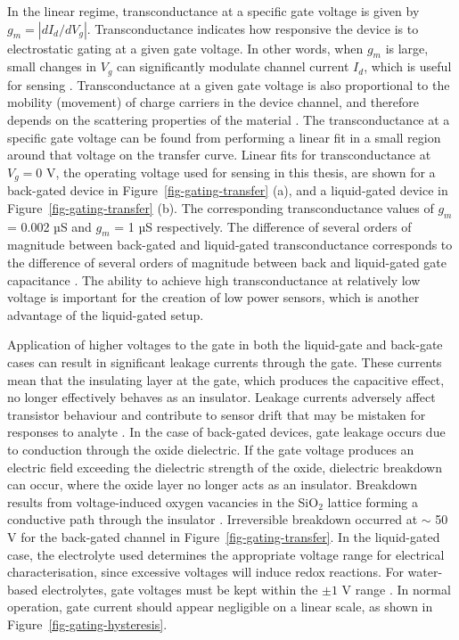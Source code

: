 \documentclass[
  a4paper,
]{scrbook}
\begin{document}
In the linear regime, transconductance at a specific gate voltage is
given by \(g_m = |dI_{d}/dV_g|\). Transconductance indicates how
responsive the device is to electrostatic gating at a given gate
voltage. In other words, when \(g_m\) is large, small changes in \(V_g\)
can significantly modulate channel current \(I_d\), which is useful for
sensing \autocite{Heller2009a,Ohno2015,Kireev2017}. Transconductance at
a given gate voltage is also proportional to the mobility (movement) of
charge carriers in the device channel, and therefore depends on the
scattering properties of the material
\autocite{Rouhi2010,Petti2016,Li2023}. The transconductance at a
specific gate voltage can be found from performing a linear fit in a
small region around that voltage on the transfer curve. Linear fits for
transconductance at \(V_g = 0\) V, the operating voltage used for
sensing in this thesis, are shown for a back-gated device in
Figure~\ref{fig-gating-transfer} (a), and a liquid-gated device in
Figure~\ref{fig-gating-transfer} (b). The corresponding transconductance
values of \(g_m\) = 0.002 µS and \(g_m\) = 1 µS respectively. The
difference of several orders of magnitude between back-gated and
liquid-gated transconductance corresponds to the difference of several
orders of magnitude between back and liquid-gated gate capacitance
\autocite{Tran2016,Shkodra2021}. The ability to achieve high
transconductance at relatively low voltage is important for the creation
of low power sensors, which is another advantage of the liquid-gated
setup.

Application of higher voltages to the gate in both the liquid-gate and
back-gate cases can result in significant leakage currents through the
gate. These currents mean that the insulating layer at the gate, which
produces the capacitive effect, no longer effectively behaves as an
insulator. Leakage currents adversely affect transistor behaviour and
contribute to sensor drift that may be mistaken for responses to analyte
\autocite{Noyce2019,Shkodra2021,Albarghouthi2022}. In the case of
back-gated devices, gate leakage occurs due to conduction through the
oxide dielectric. If the gate voltage produces an electric field
exceeding the dielectric strength of the oxide, dielectric breakdown can
occur, where the oxide layer no longer acts as an insulator. Breakdown
results from voltage-induced oxygen vacancies in the SiO\(_2\) lattice
forming a conductive path through the insulator \autocite{Padovani2017}.
Irreversible breakdown occurred at \(\sim\) 50 V for the back-gated
channel in Figure~\ref{fig-gating-transfer}. In the liquid-gated case,
the electrolyte used determines the appropriate voltage range for
electrical characterisation, since excessive voltages will induce redox
reactions. For water-based electrolytes, gate voltages must be kept
within the \(\pm 1\) V range \autocite{Wang2010,Ohno2015,Shkodra2021}.
In normal operation, gate current should appear negligible on a linear
scale, as shown in Figure~\ref{fig-gating-hysteresis}.
\end{document}
